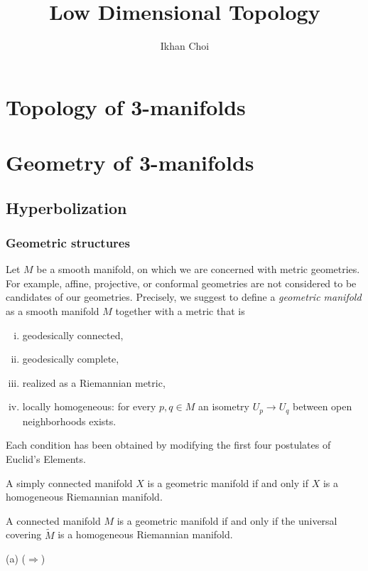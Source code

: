 \documentclass{../../large}
\begin{document}
\title{Low Dimensional Topology}
\author{Ikhan Choi}
\maketitle
\tableofcontents

\part{Topology of 3-manifolds}
\chapter{}
\chapter{}
\chapter{}


\part{Geometry of 3-manifolds}
\chapter{Hyperbolization}
\section{Geometric structures}


\begin{prb}
Let $M$ be a smooth manifold, on which we are concerned with metric geometries.
For example, affine, projective, or conformal geometries are not considered to be candidates of our geometries.
Precisely, we suggest to define a \emph{geometric manifold} as a smooth manifold $M$ together with a metric that is
\begin{enumerate}[(i)]
\item geodesically connected,
\item geodesically complete,
\item realized as a Riemannian metric,
\item locally homogeneous: for every $p,q\in M$ an isometry $U_p\to U_q$ between open neighborhoods exists.
\end{enumerate}
Each condition has been obtained by modifying the first four postulates of Euclid's Elements.
\begin{parts}
\item A simply connected manifold $X$ is a geometric manifold if and only if $X$ is a homogeneous Riemannian manifold.
\item A connected manifold $M$ is a geometric manifold if and only if the universal covering $\tilde M$ is a homogeneous Riemannian manifold.
\end{parts}
\end{prb}
\begin{pf}
(a)
($\Rightarrow$)


\end{pf}
\end{document}
